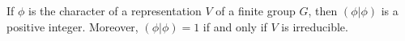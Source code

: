 If $\phi$ is the character of a representation $V$ of a finite group $G$, then $(\phi|\phi)$ is a positive integer. Moreover, $(\phi|\phi) = 1$ if and only if $V$ is irreducible.